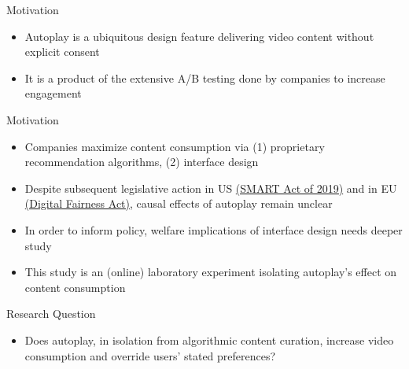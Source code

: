 \documentclass[aspectratio=169,xcolor=dvipsnames]{beamer}
\begin{document}
\begin{frame}{Motivation}
  \showprogressbar
  \centering
  \vspace{0.5em}
  \begin{itemize}
    \item Autoplay is a ubiquitous design feature delivering video content without explicit consent
    \item It is a product of the extensive A/B testing done by companies to increase engagement
  \end{itemize}
\end{frame}

\begin{frame}{Motivation}
  \begin{itemize} %
    \item Companies maximize content consumption via (1) proprietary recommendation algorithms, (2) interface design
    \item Despite subsequent legislative action in US \href{https://www.congress.gov/bill/116th-congress/senate-bill/2314/text}{(SMART Act of 2019)} and in EU \href{https://digitalfairnessact.com/what-is-the-digital-fairness-act}{(Digital Fairness Act)}, causal effects of autoplay remain unclear
    \item In order to inform policy, welfare implications of interface design needs deeper study
    \item This study is an (online) laboratory experiment isolating autoplay's effect on content consumption
  \end{itemize}
\end{frame}

\begin{frame}{Research Question}
  \begin{itemize} %
    \item Does autoplay, in isolation from algorithmic content curation, increase video consumption and override users' stated preferences?
  \end{itemize}
\end{frame}
\end{document}
